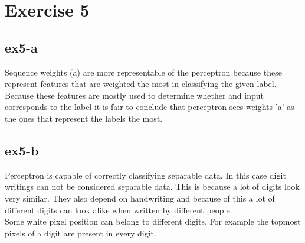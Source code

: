 \section{Exercise 5}
\subsection{ex5-a}
Sequence weights (a) are more representable of the perceptron because these represent features that are weighted the
most in classifying the given label. Because these features are mostly used to determine whether and input corresponds
to the label it is fair to conclude that perceptron sees weights 'a' as the ones that represent the labels the most.

\subsection{ex5-b}
Perceptron is capable of correctly classifying separable data. In this case digit writings can not be considered
separable data. This is because a lot of digits look very similar. They also depend on handwriting and because of this
a lot of different digits can look alike when written by different people.\\
Some white pixel position can belong to different digits. For example the topmost pixels of a digit are present in every digit.
